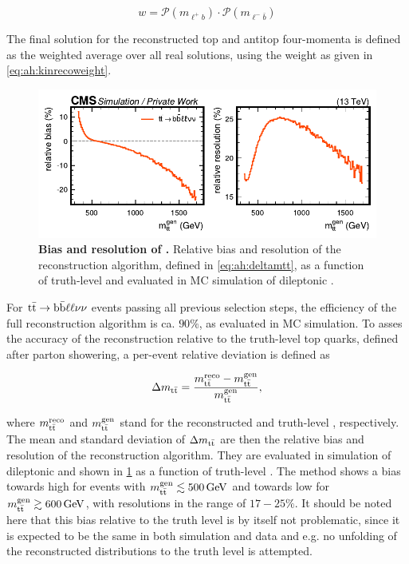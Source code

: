 \begin{equation}
\label{eq:ah:kinrecoweight}
    w = \mathcal{P} (m_{\ell^+ b}) \cdot \mathcal{P} (m_{\ell^- \bar{b}})
\end{equation}

The final solution for the reconstructed top and antitop four-momenta is defined as the weighted average over all real solutions, using the weight as given in \cref{eq:ah:kinrecoweight}.

\begin{figure}[t]
    \centering
    \includegraphics[width=0.99\linewidth]{figures/ah/mtt_resolution.pdf}
    \caption{\textbf{Bias and resolution of \mtt.} Relative bias and resolution of the \ttbar reconstruction algorithm, defined in \cref{eq:ah:deltamtt}, as a function of truth-level \mtt and evaluated in MC simulation of dileptonic \ttbar.}
    \label{fig:ah:resolution}
\end{figure}

For $\mathrm{t \bar{t}} \rightarrow \mathrm{b \bar{b}} \ell \ell \nu \nu$ events passing all previous selection steps, the efficiency of the full reconstruction algorithm is ca. $90\%$, as evaluated in MC simulation. To asses the accuracy of the reconstruction relative to the truth-level top quarks, defined after parton showering, a per-event relative deviation is defined as 

\begin{equation}
\label{eq:ah:deltamtt}
    \Delta m_{\mathrm{t \bar{t}}} = \frac{m_{\mathrm{t \bar{t}}}^{\mathrm{reco}} - m_{\mathrm{t \bar{t}}}^{\mathrm{gen}}} {m_{\mathrm{t \bar{t}}}^{\mathrm{gen}}},
\end{equation}

\noindent where $m_{\mathrm{t \bar{t}}}^{\mathrm{reco}}$ and $m_{\mathrm{t \bar{t}}}^{\mathrm{gen}}$ stand for the reconstructed and truth-level \mtt, respectively. The mean and standard deviation of $\Delta m_{\mathrm{t \bar{t}}}$ are then the relative bias and resolution of the reconstruction algorithm. They are evaluated in simulation of dileptonic \ttbar and shown in \cref{fig:ah:resolution} as a function of truth-level \mtt. The method shows a bias towards high \mtt for events with $\mtt^{\mathrm{gen}} \lesssim \SI{500}{\GeV}$ and towards low \mtt for $\mtt^{\mathrm{gen}} \gtrsim \SI{600}{\GeV}$, with resolutions in the range of $17-25\%$. It should be noted here that this bias relative to the truth level is by itself not problematic, since it is expected to be the same in both simulation and data and e.g. no unfolding of the reconstructed distributions to the truth level is attempted.

